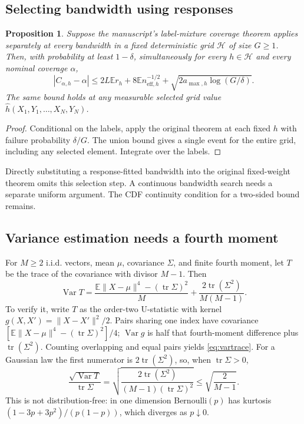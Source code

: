 \documentclass[11pt]{article}
\newtheorem{proposition}[theorem]{Proposition}
\newcommand{\E}{\mathbb E}
\newcommand{\Var}{\operatorname{Var}}
\begin{document}
\subsection{Selecting bandwidth using responses}
\begin{proposition}
Suppose the manuscript's label-mixture coverage theorem applies separately at
every bandwidth in a fixed deterministic grid $\mathcal H$ of size $G\ge1$.
Then, with probability at least $1-\delta$, simultaneously for every
$h\in\mathcal H$ and every nominal coverage $\alpha$,
\[
|C_{\alpha,h}-\alpha|\le 2L\E r_h+8\E n_{\mathrm{eff},h}^{-1/2}
+\sqrt{2a_{\max,h}\log(G/\delta)}.
\]
The same bound holds at any measurable selected grid value
$\widehat h(X_1,Y_1,\ldots,X_N,Y_N)$.
\end{proposition}
\begin{proof}
Conditional on the labels, apply the original theorem at each fixed $h$ with
failure probability $\delta/G$. The union bound gives a single event for the
entire grid, including any selected element. Integrate over the labels.
\end{proof}
Directly substituting a response-fitted bandwidth into the original fixed-weight
theorem omits this selection step. A continuous bandwidth search needs a separate
uniform argument. The CDF continuity condition for a two-sided bound remains.

\subsection{Variance estimation needs a fourth moment}
For $M\ge2$ i.i.d. vectors, mean $\mu$, covariance $\Sigma$, and finite fourth
moment, let $T$ be the trace of the covariance with divisor $M-1$. Then
\begin{equation}\label{eq:vartrace}
\Var T=\frac{\E\lVert X-\mu\rVert^4-(\operatorname{tr}\Sigma)^2}{M}
+\frac{2\operatorname{tr}(\Sigma^2)}{M(M-1)}.
\end{equation}
To verify it, write $T$ as the order-two U-statistic with kernel
$g(X,X')=\lVert X-X'\rVert^2/2$. Pairs sharing one index have covariance
$[\E\lVert X-\mu\rVert^4-(\operatorname{tr}\Sigma)^2]/4$;
$\Var g$ is half that fourth-moment difference plus $\operatorname{tr}(\Sigma^2)$.
Counting overlapping and equal pairs yields \eqref{eq:vartrace}.
For a Gaussian law the first numerator is $2\operatorname{tr}(\Sigma^2)$, so,
when $\operatorname{tr}\Sigma>0$,
\[
\frac{\sqrt{\Var T}}{\operatorname{tr}\Sigma}
=\sqrt{\frac{2\operatorname{tr}(\Sigma^2)}{(M-1)(\operatorname{tr}\Sigma)^2}}
\le\sqrt{\frac2{M-1}}.
\]
This is not distribution-free: in one dimension Bernoulli$(p)$ has kurtosis
$(1-3p+3p^2)/(p(1-p))$, which diverges as $p\downarrow0$.
\end{document}
